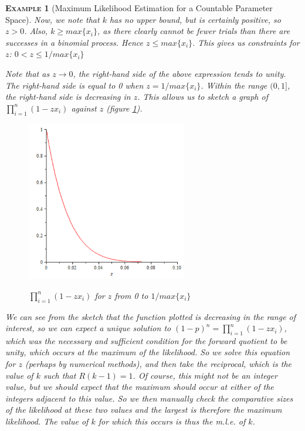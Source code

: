 \documentclass[12pt,a4paper]{article}
\newtheorem{example}{\textsc{Example}}[section]
\begin{document}
\begin{example}[Maximum Likelihood Estimation for a Countable Parameter Space]
Now, we note that $k$ has no upper bound, but is certainly positive, so $z>0$. Also, $k \geq max\{x_i\}$, as there clearly cannot be fewer trials than there are successes in a binomial process. Hence $z \leq max\{x_i\}$. This gives us constraints for $z$: $0<z\leq 1/max\{x_i\}$

Note that as $z \rightarrow 0$, the right-hand side of the above expression tends to unity. The right-hand side is equal to 0 when $z = 1/max\{x_i\}$. Within the range $(0,1]$, the right-hand side is decreasing in $z$. This allows us to sketch a graph of $\prod_{i=1}^n (1-zx_i)$ against $z$ (figure \ref{figure discrete MLE}).

\begin{figure}[h]
\begin{center}
\includegraphics[height=7cm,width=7cm]{M2S1 Discrete MLE.png}\label{figure discrete MLE}
\caption{$\prod\limits_{i=1}^n (1-zx_i)$ for $z$ from 0 to $1/max\{x_i\}$}
\end{center}
\end{figure}

We can see from the sketch that the function plotted is decreasing in the range of interest, so we can expect a unique solution to $(1-p)^n = \prod_{i=1}^n (1-zx_i)$, which was the necessary and sufficient condition for the forward quotient to be unity, which occurs at the maximum of the likelihood. So we solve this equation for $z$ (perhaps by numerical methods), and then take the reciprocal, which is the value of $k$ such that $R(k-1) = 1$. Of course, this might not be an integer value, but we should expect that the maximum should occur at either of the integers adjacent to this value. So we then manually check the comparative sizes of the likelihood at these two values and the largest is therefore the maximum likelihood. The value of $k$ for which this occurs is thus the m.l.e. of $k$.

\end{example}
\end{document}
